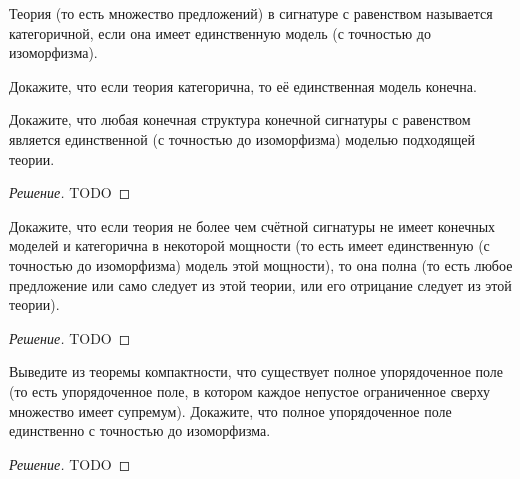    \begin{problem}[3]
        Теория (то есть множество предложений) в сигнатуре с равенством называется категоричной, если она имеет единственную модель (с точностью до изоморфизма).

        Докажите, что если теория категорична, то её единственная модель конечна.

        Докажите, что любая конечная структура конечной сигнатуры с равенством является единственной (с точностью до изоморфизма) моделью подходящей теории.
    \end{problem}
    \begin{proof}[Решение]
        TODO
    \end{proof}
    
    \begin{problem}[4]
        Докажите, что если теория не более чем счётной сигнатуры не имеет конечных моделей и категорична в некоторой мощности (то есть имеет единственную (с точностью до изоморфизма) модель этой мощности), то она полна (то есть любое предложение или само следует из этой теории, или его отрицание следует из этой теории).
    \end{problem}
    \begin{proof}[Решение]


        TODO
    \end{proof}

    \begin{problem}[5]
        Выведите из теоремы компактности, что существует полное упорядоченное поле (то есть упорядоченное поле, в котором каждое непустое ограниченное сверху множество имеет супремум). Докажите, что полное упорядоченное поле единственно с точностью до изоморфизма.
    \end{problem}
    \begin{proof}[Решение]
        TODO
    \end{proof}
